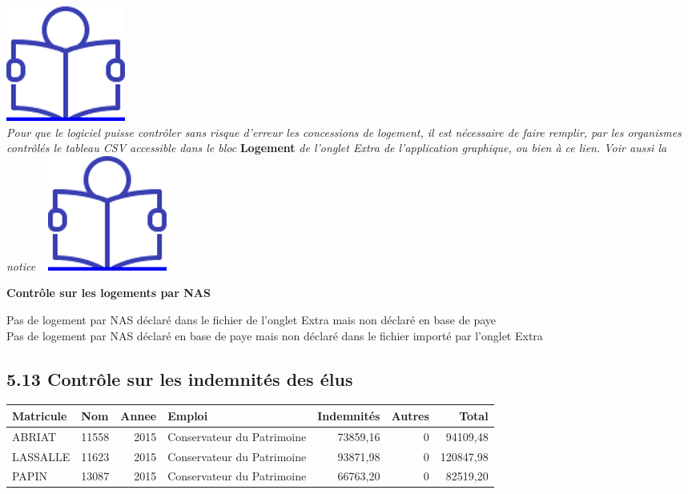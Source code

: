 \href{../Docs/Notices/fiche_NAS.odt}{\includegraphics{icones/Notice.png}}\\
\emph{Pour que le logiciel puisse contrôler sans risque d'erreur les
concessions de logement, il est nécessaire de faire remplir, par les
organismes contrôlés le tableau CSV accessible dans le bloc}
\textbf{Logement} \emph{de l'onglet Extra de l'application graphique, ou
bien à ce lien. Voir aussi la notice} ~
\href{../Docs/Notices/fiche_tableau_logements.odt}{\includegraphics{icones/Notice.png}}

\textbf{Contrôle sur les logements par NAS}

Pas de logement par NAS déclaré dans le fichier de l'onglet Extra mais
non déclaré en base de paye\\
Pas de logement par NAS déclaré en base de paye mais non déclaré dans le
fichier importé par l'onglet Extra

\hypertarget{controle-sur-les-indemnites-des-elus}{%
\subsection{5.13 Contrôle sur les indemnités des
élus}\label{controle-sur-les-indemnites-des-elus}}

\begin{longtable}[]{@{}llrlrrr@{}}
\toprule
Matricule & Nom & Annee & Emploi & Indemnités & Autres &
Total\tabularnewline
\midrule
\endhead
ABRIAT & 11558 & 2015 & Conservateur du Patrimoine & 73859,16 & 0 &
94109,48\tabularnewline
LASSALLE & 11623 & 2015 & Conservateur du Patrimoine & 93871,98 & 0 &
120847,98\tabularnewline
PAPIN & 13087 & 2015 & Conservateur du Patrimoine & 66763,20 & 0 &
82519,20\tabularnewline
\bottomrule
\end{longtable}

